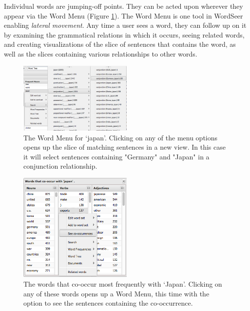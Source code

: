\documentclass{sig-alternate}
\begin{document}
\begin{enumerate}
Individual words are jumping-off points. They can be acted upon wherever they appear via the Word Menu (Figure \ref{fig:intro08}). The Word Menu is one tool in  WordSeer enabling \emph{lateral movement}.  Any time a user sees a word, they can follow up on it by examining the grammatical relations in which it occurs, seeing related words,  and creating visualizations of the slice of sentences that contains the word, as well as the slices containing various relationships to other words.

\begin{figure}[ht!]
\begin{center}
	\includegraphics[width=0.5\textwidth]{fig/intro/08.png}
\end{center}
    \caption{%
      The Word Menu for `japan'.  Clicking on any of the menu options opens up the slice of matching sentences in a new view.  In this case it will select sentences containing "Germany" and "Japan" in a conjunction relationship. \label{fig:intro08}}%
\end{figure}


\begin{figure}[ht!]
\begin{center}
	\includegraphics[width=0.5\textwidth]{fig/intro/09.png}
\end{center}
    \caption{%
 		The words that co-occur most frequently with `Japan'. Clicking on any of these words opens up a Word Menu, this time with the option to see the sentences containing the co-occurrence.
	\label{fig:intro09}}%
\end{figure}



\end{enumerate}
\end{document}
